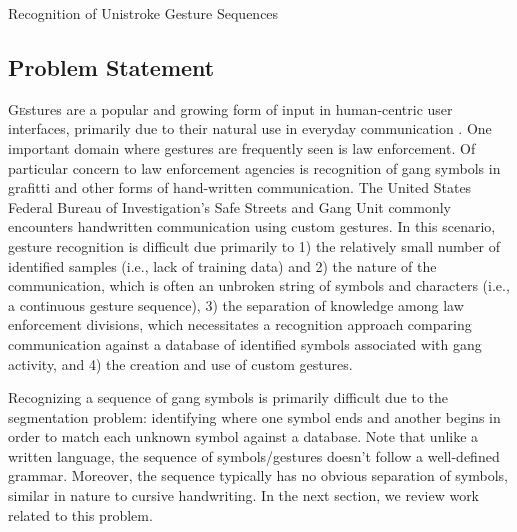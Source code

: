 \documentclass[twoside]{article}
\begin{document}
\centerline{Recognition of Unistroke Gesture Sequences}
\normalsize


\begin{multicols}{2} %

\section{Problem Statement}
\lettrine[nindent=0em,lines=2]{G}estures are a popular and growing form of input in human-centric user
interfaces, primarily due to their natural use in everyday communication \cite{mitra_gesture_2007}.
One important domain where gestures are frequently seen is law enforcement.
Of particular concern to law enforcement
agencies is recognition of gang symbols in grafitti and other forms of
hand-written communication. The United States Federal Bureau of Investigation's
Safe Streets and Gang Unit commonly encounters handwritten communication
using custom gestures\cite{lyddane_donald_united_2006}. In this scenario,
gesture recognition is difficult due primarily to 1) the relatively small number
of identified samples (i.e., lack of training data) and 2) the nature of the
communication, which is often an unbroken string of symbols and characters
(i.e., a continuous gesture sequence), 3) the separation of
knowledge among law enforcement divisions, which necessitates a recognition approach comparing communication against a database of identified symbols
associated with gang activity, and 4) the creation and use of custom gestures.

Recognizing a sequence of gang symbols is primarily difficult due to the
segmentation problem: identifying where one symbol ends and another begins in
order to match each unknown symbol against a database.
Note that unlike a written language, the sequence of symbols/gestures doesn't
follow a well-defined grammar. Moreover, the sequence typically has no obvious
separation of symbols, similar in nature to cursive handwriting. In the next section,
we review work related to this problem. 


\end{multicols}
\end{document}
